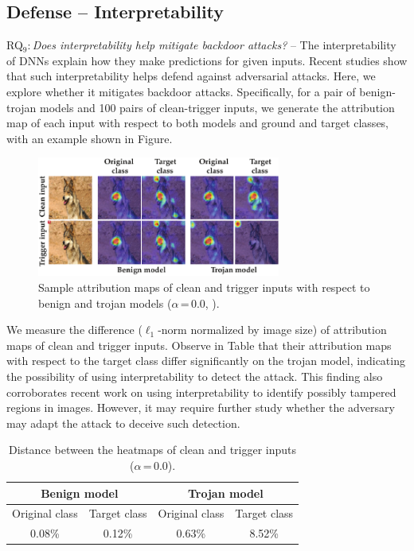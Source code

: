 \documentclass[compsoc,conference,a4paper,10pt,times]{IEEEtran}
\begin{document}
\subsection{Defense -- Interpretability}

{RQ$_9$:\,{\em Does interpretability help mitigate backdoor attacks?}} -- The interpretability of DNNs explain how they make predictions for given inputs. Recent studies show that such interpretability helps defend against adversarial attacks. Here, we explore whether it mitigates backdoor attacks. Specifically, for a pair of benign-trojan models and 100 pairs of clean-trigger inputs, we generate the attribution map of each input with respect to both models and ground and target classes, with an example shown in Figure. 

\begin{figure}[!ht]
    \centering
    \includegraphics[width=80mm]{figures/examples.pdf}
    \caption{Sample attribution maps of clean and trigger inputs with respect to benign and trojan models ($\alpha$\,=\,0.0, \imgnet). \label{fig:example}}
\end{figure}


We measure the difference ($\ell_1$-norm normalized by image size) of attribution maps of clean and trigger inputs. Observe in Table that their attribution maps with respect to the target class differ significantly on the trojan model, indicating the possibility of using interpretability to detect the attack. This finding also corroborates recent work on using interpretability to identify possibly tampered regions in images. However, it may require further study whether the adversary may adapt the attack to deceive such detection.



\begin{table}[!ht]{\footnotesize
    \centering
    \renewcommand{\arraystretch}{1.2}
    \begin{tabular}{c|c|c|c}
    \multicolumn{2}{c|}{Benign model} &  \multicolumn{2}{c}{Trojan model} \\
    \hline
    {Original class} & {Target class} &  {Original class} & {Target class} \\
    \hline
    \hline
    0.08\% & 0.12\% & 0.63\% &\cellcolor{Red}8.52\% \\
    \end{tabular}
    \caption{Distance between the heatmaps of clean and trigger inputs ($\alpha$\,=\,0.0).  \label{tab:map-difference} }}
\end{table}
    
\end{document}
